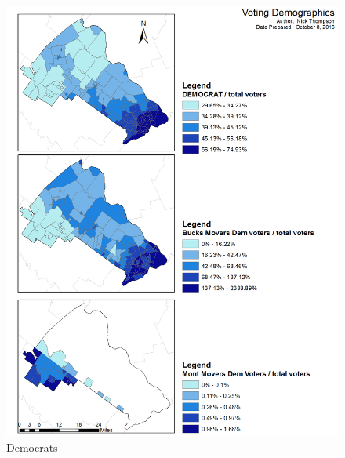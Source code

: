 \documentclass[12pt]{article}
\begin{document}
\begin{figure}
	\caption{Democrats}
	\centerline{\includegraphics[scale=.75]{question_4b.png}} %
\end{figure}

\clearpage
\end{document}
